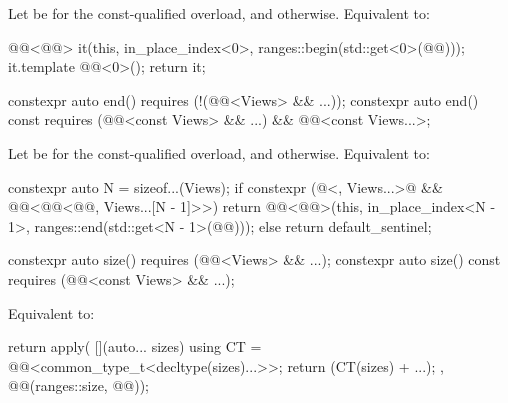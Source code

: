 \begin{itemdescr}
\pnum
\effects
Let  be
 for the const-qualified overload, and
 otherwise.
Equivalent to:
\begin{codeblock}
@@<@@> it(this, in_place_index<0>, ranges::begin(std::get<0>(@@)));
it.template @@<0>();
return it;
\end{codeblock}
\end{itemdescr}

%
\begin{itemdecl}
constexpr auto end() requires (!(@@<Views> && ...));
constexpr auto end() const
  requires (@@<const Views> && ...) && @@<const Views...>;
\end{itemdecl}

\begin{itemdescr}
\pnum
\effects
Let  be
 for the const-qualified overload, and
 otherwise.
Equivalent to:
\begin{codeblock}
constexpr auto N = sizeof...(Views);
if constexpr (@<, Views...>@ &&
              @@<@@<@@, Views...[N - 1]>>) {
  return @@<@@>(this, in_place_index<N - 1>,
                            ranges::end(std::get<N - 1>(@@)));
} else {
  return default_sentinel;
}
\end{codeblock}
\end{itemdescr}

%
\begin{itemdecl}
constexpr auto size() requires (@@<Views> && ...);
constexpr auto size() const requires (@@<const Views> && ...);
\end{itemdecl}

\begin{itemdescr}
\pnum
\effects
Equivalent to:
\begin{codeblock}
return apply(
  [](auto... sizes) {
    using CT = @@<common_type_t<decltype(sizes)...>>;
    return (CT(sizes) + ...);
  },
  @@(ranges::size, @@));
\end{codeblock}
\end{itemdescr}

